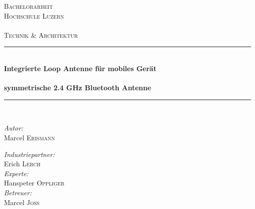 \begin{titlepage}

\begin{center}

\textsc{\LARGE Bachelorarbeit}\\[1.5cm]

\textsc{\Large Hochschule Luzern\\
    ~\\
    Technik \& Architektur}\\[0.5cm]

\vfill{}

\newcommand{\HRule}{\rule{\linewidth}{0.5mm}}
\HRule \\[0.4cm]
{   \Huge \bfseries Integrierte Loop Antenne für mobiles Gerät\\
        ~\\
        \large symmetrische 2.4 GHz Bluetooth Antenne}\\[0.4cm]

\HRule \\[1.5cm]

\begin{minipage}{0.4\textwidth}
    \begin{flushleft} \large
        \emph{Autor:}\\
        Marcel \textsc{Erismann}\\
    \end{flushleft}
\end{minipage}
\hfill
\begin{minipage}{0.4\textwidth}
    \begin{flushright} \large
          \emph{Industriepartner:} \\
         Erich \textsc{Lerch}\\
         \vspace{0.5cm}
         \emph{Experte:} \\
         Hanspeter  \textsc{Oppliger}\\
         \vspace{0.5cm}
         \emph{Betreuer:} \\
         Marcel  \textsc{Joss}
    \end{flushright}
\end{minipage}



\end{center}
\end{titlepage}

